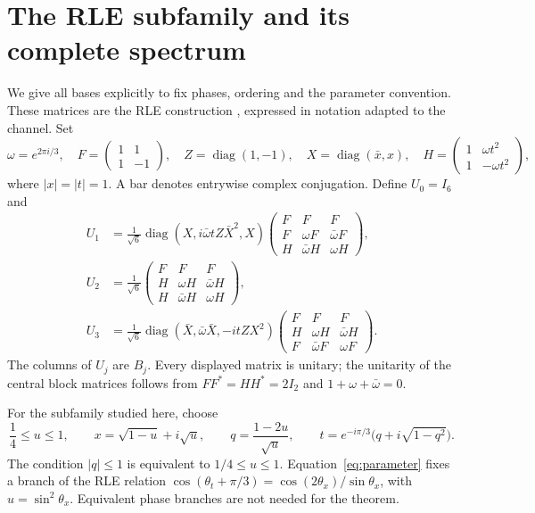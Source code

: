 \documentclass[11pt,a4paper]{article}
\theoremstyle{remark}
\DeclareMathOperator{\diag}{diag}
\begin{document}
\section{The RLE subfamily and its complete spectrum}
We give all bases explicitly to fix phases, ordering and the parameter convention. These matrices are the RLE construction \cite[Eqs.~(5)--(7)]{rle}, expressed in notation adapted to the channel.
Set
\[
 \omega=e^{2\pi i/3},\quad
 F=\begin{pmatrix}1&1\\1&-1\end{pmatrix},\quad
 Z=\diag(1,-1),\quad X=\diag(\bar x,x),\quad
 H=\begin{pmatrix}1&\omega t^2\\1&-\omega t^2\end{pmatrix},
\]
where $|x|=|t|=1$. A bar denotes entrywise complex conjugation. Define $U_0=I_6$ and
\begin{align}
 U_1&=\frac1{\sqrt6}\diag\!\left(X,i\bar\omega tZ\bar X^2,X\right)
 \begin{pmatrix}F&F&F\\ F&\omega F&\bar\omega F\\ H&\bar\omega H&\omega H\end{pmatrix},\label{eq:u1}\\
 U_2&=\frac1{\sqrt6}
 \begin{pmatrix}F&F&F\\ H&\omega H&\bar\omega H\\ H&\bar\omega H&\omega H\end{pmatrix},\label{eq:u2}\\
 U_3&=\frac1{\sqrt6}\diag\!\left(\bar X,\bar\omega\bar X,-itZX^2\right)
 \begin{pmatrix}F&F&F\\ H&\omega H&\bar\omega H\\ F&\bar\omega F&\omega F\end{pmatrix}.\label{eq:u3}
\end{align}
The columns of $U_j$ are $B_j$. Every displayed matrix is unitary; the unitarity of the central block matrices follows from $FF^*=HH^*=2I_2$ and $1+\omega+\bar\omega=0$.

For the subfamily studied here, choose
\begin{equation}\label{eq:parameter}
 \frac14\le u\le1,\qquad
 x=\sqrt{1-u}+i\sqrt u,\qquad
 q=\frac{1-2u}{\sqrt u},\qquad
 t=e^{-i\pi/3}\bigl(q+i\sqrt{1-q^2}\bigr).
\end{equation}
The condition $|q|\le1$ is equivalent to $1/4\le u\le1$. Equation~\eqref{eq:parameter} fixes a branch of the RLE relation $\cos(\theta_t+\pi/3)=\cos(2\theta_x)/\sin\theta_x$, with $u=\sin^2\theta_x$. Equivalent phase branches are not needed for the theorem.
\end{document}
